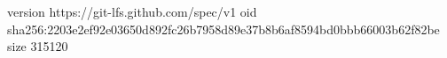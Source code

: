 version https://git-lfs.github.com/spec/v1
oid sha256:2203e2ef92e03650d892fc26b7958d89e37b8b6af8594bd0bbb66003b62f82be
size 315120
